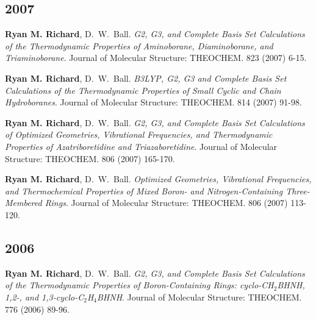 \documentclass[11pt,a4paper,sans]{moderncv}
\begin{document}
\begin{etaremune}
	\subsection{2007}
	\item{\textbf{Ryan M. Richard}, D.~W.~Ball. {\em G2, G3, and Complete Basis 
	      Set Calculations of the Thermodynamic Properties of Aminoborane, 
		  Diaminoborane, and Triaminoborane}.  Journal of Molecular Structure: 
		  THEOCHEM.  823 (2007) 6-15.}
	\item{\textbf{Ryan M. Richard}, D.~W.~Ball. {\em B3LYP, G2, G3 and Complete 
	      Basis Set Calculations of the Thermodynamic Properties of Small Cyclic
		  and Chain Hydroboranes}.  Journal of Molecular Structure: THEOCHEM. 
		  814 (2007) 91-98.}
	\item{\textbf{Ryan M. Richard}, D.~W.~Ball. {\em G2, G3, and Complete Basis 
	      Set Calculations of Optimized Geometries, Vibrational Frequencies, and
		  Thermodynamic Properties of Azatriboretidine and Triazaboretidine}.  
		  Journal of Molecular Structure: THEOCHEM.  806 (2007) 165-170.}
	\item{\textbf{Ryan M. Richard}, D.~W.~Ball.  {\em Optimized Geometries, 
	      Vibrational Frequencies, and Thermochemical Properties of Mixed Boron- 
		  and Nitrogen-Containing Three-Membered Rings}. Journal of Molecular 
		  Structure: THEOCHEM.  806 (2007) 113-120.}

	\subsection{2006}
	\item{\textbf{Ryan M. Richard}, D.~W.~Ball. {\em G2, G3, and Complete Basis 
	      Set Calculations of the Thermodynamic Properties of Boron-Containing 
		  Rings: cyclo-CH$_2$BHNH, 1,2-, and 1,3-cyclo-C$_2$H$_4$BHNH}. Journal 
		  of Molecular Structure: THEOCHEM.  776 (2006) 89-96. }
\end{etaremune}
\end{document}

